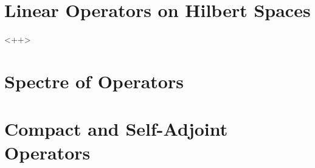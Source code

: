 \documentclass[../mmf.tex]{subfiles}
\begin{document}
\section{Linear Operators on Hilbert Spaces}
<++>
\section{Spectre of Operators}
\section{Compact and Self-Adjoint Operators}
\end{document}
